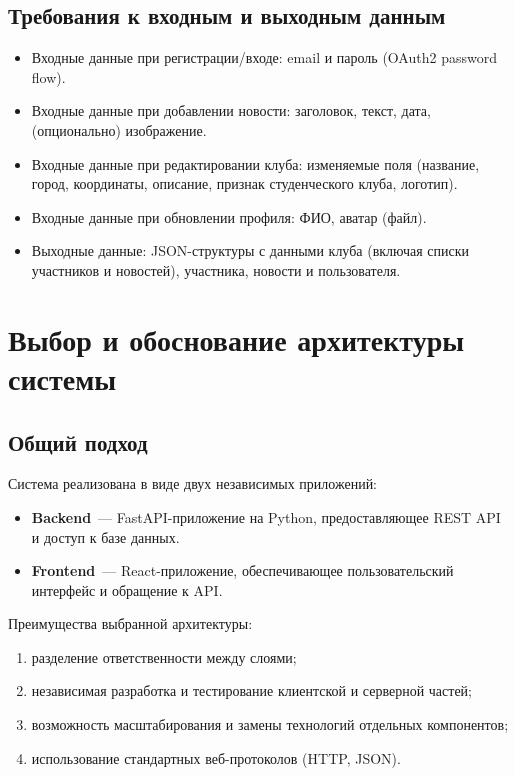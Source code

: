 \documentclass[utf8, russian]{eskdtext}
\let\stdsection\section
\renewcommand \section{\newpage\stdsection}
\begin{document}
\subsection{Требования к входным и выходным данным}
\begin{itemize}
  \item Входные данные при регистрации/входе: email и пароль (OAuth2 password flow).
  \item Входные данные при добавлении новости: заголовок, текст, дата, (опционально) изображение.
  \item Входные данные при редактировании клуба: изменяемые поля (название, город, координаты, описание, признак студенческого клуба, логотип).
  \item Входные данные при обновлении профиля: ФИО, аватар (файл).
  \item Выходные данные: JSON-структуры с данными клуба (включая списки участников и новостей), участника, новости и пользователя.
\end{itemize}

\section{Выбор и обоснование архитектуры системы}
\subsection{Общий подход}
Система реализована в виде двух независимых приложений:
\begin{itemize}
  \item \textbf{Backend}~--- FastAPI-приложение на Python, предоставляющее REST API и доступ к базе данных.
  \item \textbf{Frontend}~--- React-приложение, обеспечивающее пользовательский интерфейс и обращение к API.
\end{itemize}

Преимущества выбранной архитектуры:
\begin{enumerate}
  \item разделение ответственности между слоями;
  \item независимая разработка и тестирование клиентской и серверной частей;
  \item возможность масштабирования и замены технологий отдельных компонентов;
  \item использование стандартных веб-протоколов (HTTP, JSON).
\end{enumerate}
\end{document}
